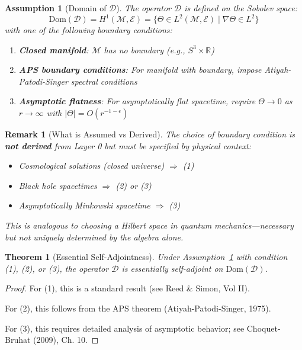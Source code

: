 \documentclass[12pt]{article}
\newtheorem{theorem}[definition]{Theorem}
\newtheorem{remark}[definition]{Remark}
\newtheorem{assumption}{Assumption}[section]
\newcommand{\R}{\mathbb{R}}
\newcommand{\M}{\mathcal{M}}
\newcommand{\Dom}{\mathrm{Dom}}
\begin{document}
\begin{assumption}[Domain of $\mathcal{D}$]
\label{ass:domain}
The operator $\mathcal{D}$ is defined on the Sobolev space:
\begin{equation}
\Dom(\mathcal{D}) = H^1(\M, \mathcal{E}) = \{ \Theta \in L^2(\M, \mathcal{E}) \mid \nabla \Theta \in L^2 \}
\end{equation}
with one of the following boundary conditions:
\begin{enumerate}
    \item \textbf{Closed manifold}: $\M$ has no boundary (e.g., $S^3 \times \R$)
    \item \textbf{APS boundary conditions}: For manifold with boundary, impose Atiyah-Patodi-Singer spectral conditions
    \item \textbf{Asymptotic flatness}: For asymptotically flat spacetime, require $\Theta \to 0$ as $r \to \infty$ with $|\Theta| = O(r^{-1-\epsilon})$
\end{enumerate}
\end{assumption}

\begin{remark}[What is Assumed vs Derived]
The choice of boundary condition is \textbf{not derived} from Layer 0 but must be specified by physical context:
\begin{itemize}
    \item Cosmological solutions (closed universe) $\Rightarrow$ (1)
    \item Black hole spacetimes $\Rightarrow$ (2) or (3)
    \item Asymptotically Minkowski spacetime $\Rightarrow$ (3)
\end{itemize}
This is analogous to choosing a Hilbert space in quantum mechanics—necessary but not uniquely determined by the algebra alone.
\end{remark}

\begin{theorem}[Essential Self-Adjointness]
Under Assumption~\ref{ass:domain} with condition (1), (2), or (3), the operator $\mathcal{D}$ is essentially self-adjoint on $\Dom(\mathcal{D})$.
\end{theorem}

\begin{proof}
For (1), this is a standard result (see Reed \& Simon, Vol II).

For (2), this follows from the APS theorem (Atiyah-Patodi-Singer, 1975).

For (3), this requires detailed analysis of asymptotic behavior; see Choquet-Bruhat (2009), Ch. 10.
\end{proof}
\end{document}
